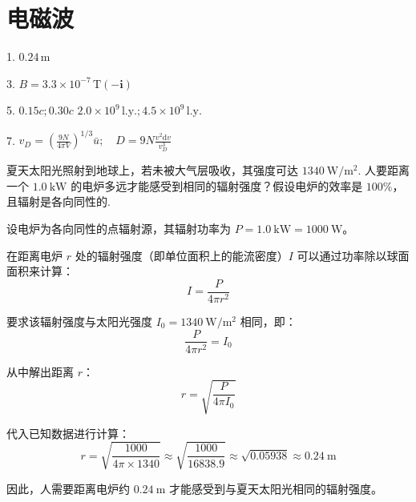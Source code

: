 \chapter{电磁波}

\begin{oddanswers}
1. $0.24\,\mathrm{m}$

3. $B = 3.3 \times 10^{-7}\,\mathrm{T} (-\mathbf{i})$

5. $0.15c; 0.30c$
$2.0 \times 10^9\,\mathrm{l.y.}; 4.5 \times 10^9\,\mathrm{l.y.}$

7. $v_D = \left(\frac{9N}{4\pi V}\right)^{1/3} \bar{u}; \quad D = 9N \frac{v^2 \mathrm{d}v}{v_D^3}$
\end{oddanswers}

\begin{exercise}\label{ex:21.1}
夏天太阳光照射到地球上，若未被大气层吸收，其强度可达 $1340 \ \mathrm{W/m^2}$. 人要距离一个 $1.0 \ \mathrm{kW}$ 的电炉多远才能感受到相同的辐射强度？假设电炉的效率是 $100\%$，且辐射是各向同性的.
\end{exercise}
\begin{solution}
设电炉为各向同性的点辐射源，其辐射功率为 $P = 1.0 \ \mathrm{kW} = 1000 \ \mathrm{W}$。

在距离电炉 $r$ 处的辐射强度（即单位面积上的能流密度）$I$ 可以通过功率除以球面面积来计算：
$$ I = \frac{P}{4\pi r^2} $$

要求该辐射强度与太阳光强度 $I_0 = 1340 \ \mathrm{W/m^2}$ 相同，即：
$$ \frac{P}{4\pi r^2} = I_0 $$

从中解出距离 $r$：
$$ r = \sqrt{\frac{P}{4\pi I_0}} $$

代入已知数据进行计算：
$$ r = \sqrt{\frac{1000}{4\pi \times 1340}} \approx \sqrt{\frac{1000}{16838.9}} \approx \sqrt{0.05938} \approx 0.24 \ \mathrm{m} $$

因此，人需要距离电炉约 $0.24 \ \mathrm{m}$ 才能感受到与夏天太阳光相同的辐射强度。
\end{solution}

